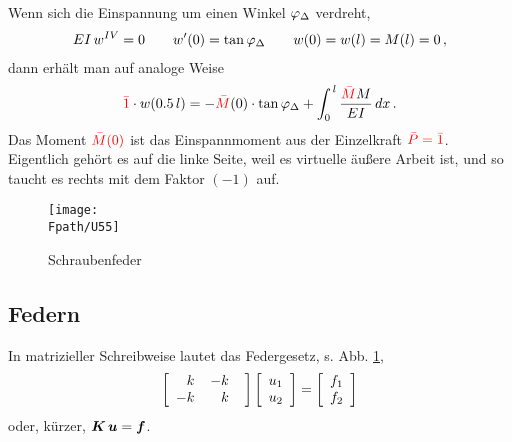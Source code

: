 {{{{Wenn sich die Einspannung um einen Winkel $\varphi_\Delta $ verdreht,
\begin{align}
EI\,w^{IV} = 0 \qquad w'(0) = \tan \varphi_\Delta \qquad w(0) = w(l) = M(l) = 0\,,
\end{align}
dann erh\"{a}lt man auf analoge Weise
\begin{align}
\textcolor{red}{\bar{1}}\cdot w(0.5\,l) = - \textcolor{red}{\bar{M}}(0) \cdot \tan \varphi_\Delta + \int_0^{\,l} \frac{\textcolor{red}{\bar{M}}  M}{EI}\,dx\,.
\end{align}
Das Moment $\textcolor{red}{\bar{M}(0)} $ ist das Einspannmoment aus der Einzelkraft $\textcolor{red}{\bar{P} = \bar{1}}$. Eigentlich geh\"{o}rt es auf die linke Seite, weil es virtuelle \"{a}u{\ss}ere Arbeit ist, und so taucht es rechts mit dem Faktor $(-1) $ auf.
\begin{figure}[tbp]
\centering
\if {} \sidecaption \fi
\texttt{[image: \\Fpath/U55]}
\caption{Schraubenfeder} \label{U55}
\end{figure}%


{\textcolor{sectionTitleBlue}{\section{Federn}}}
In matrizieller Schreibweise lautet das Federgesetz, s. Abb. \ref{U55},
\begin{align}
\left[ \barr {r @{\hspace{4mm}}r @{\hspace{4mm}}r
@{\hspace{4mm}}r @{\hspace{4mm}}r}
      k & -k  \\
      -k & k \\
     \earr \right]\left [\barr{c}  u_1 \\  u_2\earr \right ]
=  \left [\barr{c}  f_1 \\  f_2\earr \right ]
\end{align}
oder, k\"{u}rzer, $\mbox{\boldmath $K$}\,\mbox{\boldmath $u$} = \mbox{\boldmath $f$}$.

}}}}
